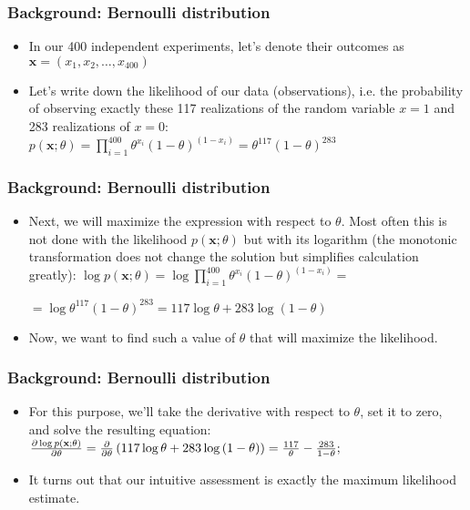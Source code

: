 \begin{frame}[fragile]\frametitle{Background: Bernoulli distribution}
\begin{itemize}
\item In our 400 independent experiments, let's denote their outcomes as $\textbf{x} = \left(x_1, x_2, \ldots, x_{400}\right)$
\item Let's write down the likelihood of our data (observations), i.e. the probability of observing exactly these 117 realizations of the random variable $x=1$ and 283 realizations of $x=0$:
$ p(\textbf{x}; \theta) = \prod_{i=1}^{400} \theta^{x_i} \left(1 - \theta\right)^{\left(1 - x_i\right)} = \theta^{117} \left(1 - \theta\right)^{283}$
\end{itemize}
\end{frame}

\begin{frame}[fragile]\frametitle{Background: Bernoulli distribution}
\begin{itemize}
\item Next, we will maximize the expression with respect to $\theta$. Most often this is not done with the likelihood $p(\textbf{x}; \theta)$ but with its logarithm (the monotonic transformation does not change the solution but simplifies calculation greatly):
$ \log p(\textbf{x}; \theta) = \log \prod_{i=1}^{400} \theta^{x_i} \left(1 - \theta\right)^{\left(1 - x_i\right)} =$

$ = \log \theta^{117} \left(1 - \theta\right)^{283} =  117 \log \theta + 283 \log \left(1 - \theta\right)$
\item Now, we want to find such a value of $\theta$ that will maximize the likelihood.
\end{itemize}
\end{frame}

\begin{frame}[fragile]\frametitle{Background: Bernoulli distribution}
\begin{itemize}
\item For this purpose, we'll take the derivative with respect to $\theta$, set it to zero, and solve the resulting equation: $\Large  \frac{\partial \log p(\textbf{x}; \theta)}{\partial \theta} = \frac{\partial}{\partial \theta} \left(117 \log \theta + 283 \log \left(1 - \theta\right)\right) = \frac{117}{\theta} - \frac{283}{1 - \theta};$

\item It turns out that our intuitive assessment is exactly the maximum likelihood estimate.
\end{itemize}
\end{frame}

